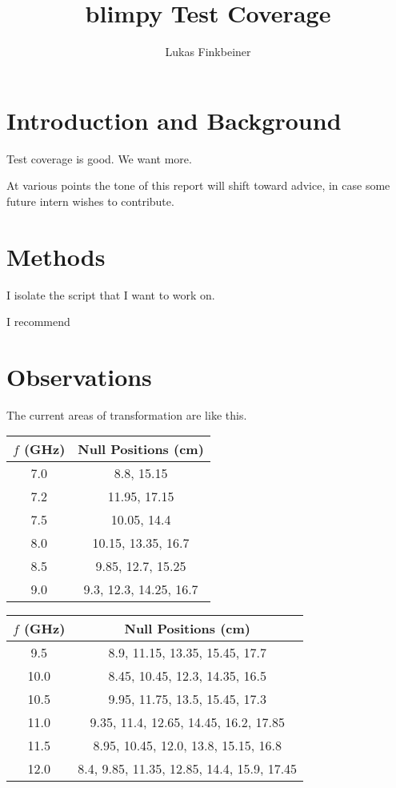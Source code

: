\documentclass[12pt]{article}
\title{blimpy Test Coverage}
\author{Lukas Finkbeiner}
\begin{document}
\maketitle


\section{Introduction and Background}

\quad \quad Test coverage is good. We want more.

At various points the tone of this report will shift toward advice, in case some future intern wishes to contribute.

\section{Methods}

\quad \quad I isolate the script that I want to work on.

I recommend

\section{Observations}

\quad \quad The current areas of transformation are like this.

\begin{center}
 \begin{tabular}{||c c||} 
 \hline
 $f$ (GHz) & Null Positions (cm)\\ [0.5ex] 
 \hline
 7.0 & 8.8, 15.15 \\ 
 \hline
 7.2 & 11.95, 17.15 \\
 \hline
 7.5 & 10.05, 14.4 \\ 
 \hline
 8.0 & 10.15, 13.35, 16.7 \\
 \hline
 8.5 & 9.85, 12.7, 15.25 \\
 \hline 
 9.0 & 9.3, 12.3, 14.25, 16.7 \\ [1ex] 
 \hline
\end{tabular}
 \begin{tabular}{||c c||} 
 \hline
 $f$ (GHz) & Null Positions (cm)\\ [0.5ex] 
 \hline
 9.5 & 8.9, 11.15, 13.35, 15.45, 17.7 \\ 
 \hline
 10.0 & 8.45, 10.45, 12.3, 14.35, 16.5 \\
 \hline
 10.5 & 9.95, 11.75, 13.5, 15.45, 17.3 \\
 \hline
 11.0 & 9.35, 11.4, 12.65, 14.45, 16.2, 17.85 \\
 \hline
 11.5 & 8.95, 10.45, 12.0, 13.8, 15.15, 16.8 \\
 \hline
 12.0 & 8.4, 9.85, 11.35, 12.85, 14.4, 15.9, 17.45 \\ [1ex] 
 \hline
\end{tabular}
\end{center}
\end{document}
